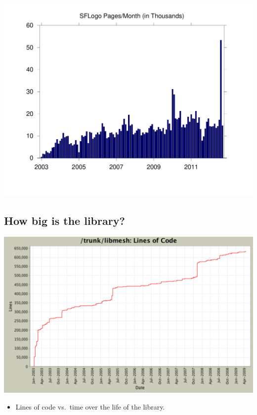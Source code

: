 \begin{frame}[t]
\begin{center}
    \includegraphics[viewport=55 50 760 560,
    clip=true,width=.95\textwidth]{figures/libmesh_sflogos}
\end{center}
\end{frame}



\subsection*{How big is the library?}
\begin{frame}[t]
\begin{center}
  \includegraphics[width=.9\textwidth]{figures/libmesh_lines_of_code}
\end{center}
\vspace{-12pt}
  \begin{itemize}
  \item {Lines of code vs.\ time over the life of the library.}
  \end{itemize}
\end{frame}
